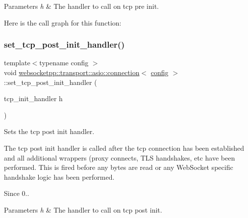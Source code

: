 \begin{DoxyParams}{Parameters}
{\em h} & The handler to call on tcp pre init. \\
\hline
\end{DoxyParams}
Here is the call graph for this function\+:
\mbox{\label{classwebsocketpp_1_1transport_1_1asio_1_1connection_a069b63faee90061ed4fa4e66d221ac18}} 
\subsubsection{\texorpdfstring{set\+\_\+tcp\+\_\+post\+\_\+init\+\_\+handler()}{set\_tcp\_post\_init\_handler()}}
{\footnotesize\ttfamily template$<$typename config $>$ \\
void \mbox{\hyperlink{classwebsocketpp_1_1transport_1_1asio_1_1connection}{websocketpp\+::transport\+::asio\+::connection}}$<$ \mbox{\hyperlink{classconfig}{config}} $>$\+::set\+\_\+tcp\+\_\+post\+\_\+init\+\_\+handler (\begin{DoxyParamCaption}\item[{tcp\+\_\+init\+\_\+handler}]{h }\end{DoxyParamCaption})\hspace{0.3cm}{\ttfamily [inline]}}



Sets the tcp post init handler. 

The tcp post init handler is called after the tcp connection has been established and all additional wrappers (proxy connects, T\+LS handshakes, etc have been performed. This is fired before any bytes are read or any Web\+Socket specific handshake logic has been performed.

\begin{DoxySince}{Since}
0..
\end{DoxySince}

\begin{DoxyParams}{Parameters}
{\em h} & The handler to call on tcp post init. \\
\hline
\end{DoxyParams}
\mbox{\label{classwebsocketpp_1_1transport_1_1asio_1_1connection_ac71341129ff5389fa84cd9ef13c8c05e}} 
